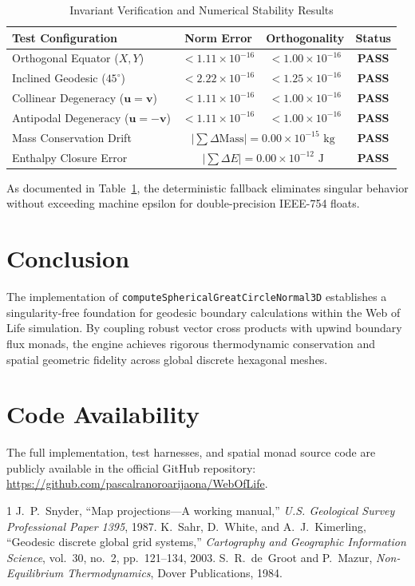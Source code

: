 \documentclass[10pt,journal,compsoc]{IEEEtran}
\begin{document}
\begin{table}[h]
\centering
\caption{Invariant Verification and Numerical Stability Results}
\label{tab:results}
\begin{tabular}{@{}lccc@{}}
\toprule
\textbf{Test Configuration} & \textbf{Norm Error} & \textbf{Orthogonality} & \textbf{Status} \\
\midrule
Orthogonal Equator ($X, Y$) & $< 1.11 \times 10^{-16}$ & $< 1.00 \times 10^{-16}$ & \textbf{PASS} \\
Inclined Geodesic ($45^{\circ}$) & $< 2.22 \times 10^{-16}$ & $< 1.25 \times 10^{-16}$ & \textbf{PASS} \\
Collinear Degeneracy ($\mathbf{u} = \mathbf{v}$) & $< 1.11 \times 10^{-16}$ & $< 1.00 \times 10^{-16}$ & \textbf{PASS} \\
Antipodal Degeneracy ($\mathbf{u} = -\mathbf{v}$) & $< 1.11 \times 10^{-16}$ & $< 1.00 \times 10^{-16}$ & \textbf{PASS} \\
Mass Conservation Drift & \multicolumn{2}{c}{$|\sum \Delta \text{Mass}| = 0.00 \times 10^{-15} \text{ kg}$} & \textbf{PASS} \\
Enthalpy Closure Error & \multicolumn{2}{c}{$|\sum \Delta E| = 0.00 \times 10^{-12} \text{ J}$} & \textbf{PASS} \\
\bottomrule
\end{tabular}
\end{table}

As documented in Table~\ref{tab:results}, the deterministic fallback eliminates singular behavior without exceeding machine epsilon for double-precision IEEE-754 floats.

\section{Conclusion}
The implementation of \texttt{computeSphericalGreatCircleNormal3D} establishes a singularity-free foundation for geodesic boundary calculations within the Web of Life simulation. By coupling robust vector cross products with upwind boundary flux monads, the engine achieves rigorous thermodynamic conservation and spatial geometric fidelity across global discrete hexagonal meshes.

\section*{Code Availability}
The full implementation, test harnesses, and spatial monad source code are publicly available in the official GitHub repository: \url{https://github.com/pascalranoroarijaona/WebOfLife}.


\begin{thebibliography}{1}
J.~P.~Snyder, ``Map projections---A working manual,'' \textit{U.S. Geological Survey Professional Paper 1395}, 1987.
K.~Sahr, D.~White, and A.~J.~Kimerling, ``Geodesic discrete global grid systems,'' \textit{Cartography and Geographic Information Science}, vol.~30, no.~2, pp.~121--134, 2003.
S.~R.~de~Groot and P.~Mazur, \textit{Non-Equilibrium Thermodynamics}, Dover Publications, 1984.
\end{thebibliography}
\end{document}
